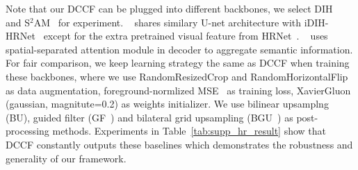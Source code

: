 \documentclass[runningheads]{llncs}
\begin{document}
Note that our DCCF can be plugged into different backbones, we select DIH~\cite{tsai2017deep} and S$^2$AM~\cite{cun2020improving} for experiment. 
~\cite{tsai2017deep} shares similary U-net\cite{Unet} architecture with iDIH-HRNet~\cite{sofiiuk2021foreground} except for the extra pretrained visual feature from HRNet~\cite{SunXLW19}. 
~\cite{cun2020improving} uses spatial-separated attention module in decoder to aggregate semantic information. 
For fair comparison, we keep learning strategy the same as DCCF when training these backbones, where we use RandomResizedCrop and RandomHorizontalFlip as data augmentation, foreground-normlized MSE~\cite{sofiiuk2021foreground} as training loss, XavierGluon (gaussian, magnitute=0.2) as weights initializer. 
We use bilinear upsamplng (BU), guided filter (GF~\cite{hekaiming2013GF}) and bilateral grid upsampling (BGU~\cite{chen2016bilateral}) as post-processing methods.
Experiments in Table~\ref{tab:supp_hr_result} show that DCCF constantly outputs these baselines which demonstrates the robustness and generality of our framework.
\end{document}
